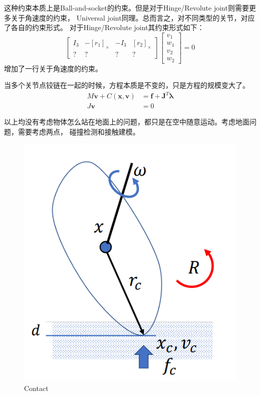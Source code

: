 \documentclass[lang=cn,newtx,10pt,scheme=chinese]{elegantbook}
\begin{document}
这种约束本质上是Ball-and-socket的约束。但是对于Hinge/Revolute joint则需要更多关于角速度的约束，
Universal joint同理。总而言之，对不同类型的关节，对应了各自的约束形式。
对于Hinge/Revolute joint其约束形式如下：
\begin{equation}
  \left[\begin{array}{cccc}
  I_3 & -\left[r_1\right]_{\times} & -I_3 & {\left[r_2\right]_{\times}} \\
  ? & ? & ? & ?
  \end{array}\right]\left[\begin{array}{c}
  v_1 \\
  w_1 \\
  v_2 \\
  w_2
  \end{array}\right]=0
\end{equation}
增加了一行关于角速度的约束。

当多个关节点铰链在一起的时候，方程本质是不变的，只是方程的规模变大了。
\begin{equation}
  \begin{aligned}
  M \dot{\boldsymbol{v}}+C(\boldsymbol{x}, \boldsymbol{v}) & =\boldsymbol{f}+\boldsymbol{J}^T \boldsymbol{\lambda} \\
  J \boldsymbol{v} & =0
  \end{aligned}
\end{equation}

以上均没有考虑物体怎么站在地面上的问题，都只是在空中随意运动。考虑地面问题，需要考虑两点，
碰撞检测和接触建模。
\begin{figure}[htbp]
  \centering
  \includegraphics[totalheight=1.5in]{"./image/Contact.png"}
  \caption{Contact} \label{fig:Contact}
\end{figure}
\end{document}
